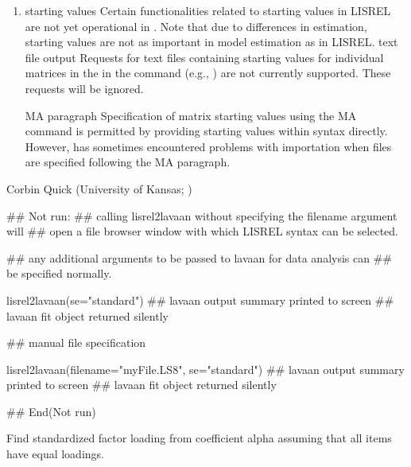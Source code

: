 \documentclass[a4paper]{book}
\begin{document}
\begin{Note}
\begin{enumerate}
\item starting values
Certain functionalities related to starting values in LISREL are not yet operational in . Note that due to differences in estimation, starting values are not as important in  model estimation as in LISREL. 
text file output
Requests for text files containing starting values for individual matrices in the in the  command (e.g., ) are not currently supported. These requests will be ignored.

MA paragraph
Specification of matrix starting values using the MA command is permitted by providing starting values within syntax directly. However,  has sometimes encountered problems with importation when files are specified following the MA paragraph. 



\end{enumerate}

\end{Note}
%
\begin{Author}\relax
Corbin Quick (University of Kansas; )
\end{Author}
%
\begin{Examples}
\begin{ExampleCode}
## Not run: 
	## calling lisrel2lavaan without specifying the filename argument will  
	## open a file browser window with which LISREL syntax can be selected. 
	
	## any additional arguments to be passed to lavaan for data analysis can
	## be specified normally. 
	
	lisrel2lavaan(se="standard")
	## lavaan output summary printed to screen
	## lavaan fit object returned silently
	
	## manual file specification 
	
	lisrel2lavaan(filename="myFile.LS8", se="standard")
	## lavaan output summary printed to screen
	## lavaan fit object returned silently

## End(Not run)
\end{ExampleCode}
\end{Examples}
%
\begin{Description}\relax
Find standardized factor loading from coefficient alpha assuming that all items have equal loadings.
\end{Description}
\end{document}

